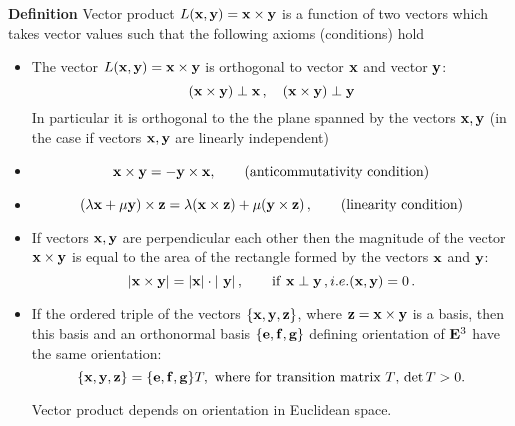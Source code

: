 \documentclass[12pt]{article}
\numberwithin{equation}{section}
\begin{document}
\m
  {\bf Definition}  Vector product  $L({\bf x},{\bf y})={\bf x}\times {\bf y}$ is a  function of two vectors
   which takes vector values
   such that the following axioms (conditions) hold
   \begin{itemize}
   \item
     The vector $L({\bf x},{\bf y})={\bf x}\times{\bf y}$ is orthogonal to vector ${\bf x}$ and vector ${\bf y}$:
      \begin{equation}\label{vectorproductaxiom1}
   ({\bf x}\times {\bf y}) \perp {\bf x}\,,\quad ({\bf x}\times {\bf y})\perp {\bf y}
\end{equation}
   In particular it is orthogonal to the
     the plane spanned by the vectors
     ${\bf x},{\bf y}$ (in the case if vectors ${\bf x},{\bf y}$ are  linearly independent)

\item

\begin{equation}\label{vectorproductaxiom2}
    {\bf x}\times {\bf y}=-{\bf y}\times {\bf x} , \qquad \hbox{(anticommutativity condition)}
\end{equation}
     \item
\begin{equation}\label{vectorproductaxiom3}
    (\lambda{\bf x}+\mu {\bf y})\times {\bf z}=\lambda ({\bf x}\times {\bf z})+\mu ({\bf y}\times {\bf z}) \, ,
     \qquad \hbox{(linearity condition)}
\end{equation}
     \item
If vectors ${\bf x},{\bf y}$ are perpendicular each other then the magnitude of the vector ${\bf x}\times {\bf y}$
is equal to the area of the rectangle formed by the vectors  ${\bf x}$ and ${\bf y}$:
\begin{equation}\label{vectorproductaxiom4}
    \vert{\bf x}\times {\bf y}\vert=\vert{\bf x}\vert\cdot\vert\ {\bf y}\vert\,,\qquad {\rm if}\,\, {\bf x}\perp {\bf y}\,, i.e. ({\bf x},{\bf y})=0\,.
\end{equation}
\item
 If the  ordered triple of the vectors $\{{\bf x},{\bf y}, {\bf z}\}$,
 where ${\bf z}={\bf x}\times {\bf y}$ is a basis,
  then this basis and an orthonormal basis $\{{\bf e},{\bf f},{\bf g}\}$ defining
orientation of ${\bf E}^3$ have the same orientation:
\begin{equation}\label{vectorproductaxiom5}
\{{\bf x},{\bf y}, {\bf z}\}=\{{\bf e},{\bf f},{\bf g}\}T, \,\, \hbox {where for transition matrix $T$, $\det T>0$.}
\end{equation}




  Vector product depends on orientation in Euclidean space.

  \end{itemize}
\end{document}
